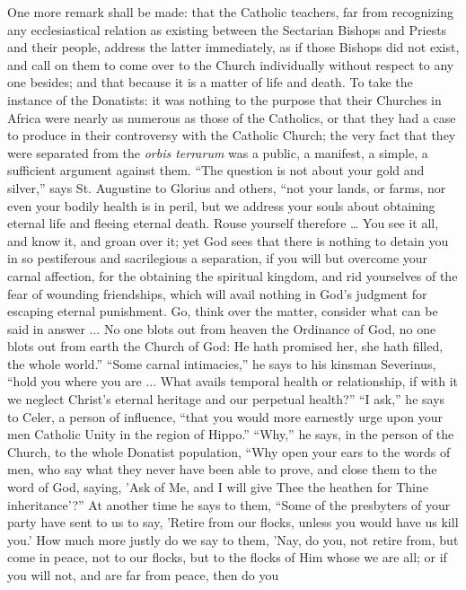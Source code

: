 One more remark shall be made: that the Catholic
teachers, far from recognizing any ecclesiastical
relation as existing between the Sectarian Bishops and
Priests and their people, address the latter immediately,
as if those Bishops did not exist, and call on them to
come over to the Church individually without respect to
any one besides; and that because it is a matter of life
and death. To take the instance of the Donatists: it was
nothing to the purpose that their Churches in Africa were
nearly as numerous as those of the Catholics, or that
they had a case to produce in their controversy with the
Catholic Church; the very fact that they were separated
from the \emph{orbis terrarum} was a public, a manifest,
a simple, a sufficient argument against them. ``The
question is not about your gold and silver,'' says
St. Augustine to Glorius and others, ``not your
lands, or farms, nor even your bodily health is in peril,
but we address your souls about obtaining eternal life
and fleeing eternal death. Rouse yourself therefore
… You see it all, and know it, and groan over it;
yet God sees that there is nothing to detain you in so
pestiferous and sacrilegious a separation, if you will
but overcome your carnal affection, for the obtaining the
spiritual kingdom, and rid yourselves of the fear of
wounding friendships, which will avail nothing in God's
judgment for escaping eternal punishment. Go, think over
the matter, consider what can be said in answer ... No
one blots out from heaven the Ordinance of God, no one
blots out from earth the Church of God: He hath promised
her, she hath filled, the whole world.'' ``Some
carnal intimacies,'' he says to his kinsman
Severinus, ``hold you where you are ... What avails
temporal health or relationship, if with it we neglect
Christ's eternal heritage and our perpetual health?''
``I ask,'' he says to Celer, a person of
influence, ``that you would more earnestly urge upon
your men Catholic Unity in the region of Hippo.''
``Why,'' he says, in the person of the Church, to
the whole Donatist population, ``Why open your ears
to the words of men, who say what they never have been
able to prove, and close them to the word of God, saying,
'Ask of Me, and I will give Thee the heathen for Thine
inheritance'?'' At another time he says to them,
``Some of the presbyters of your party have sent to
us to say, 'Retire from our flocks, unless you would have
us kill you.' How much more justly do we say to them,
'Nay, do you, not retire from, but come in peace, not to
our flocks, but to the flocks of Him whose we are all; or
if you will not, and are far from peace, then do you
